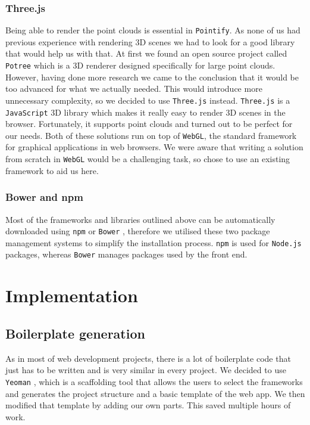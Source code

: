 \documentclass{article}
\begin{document}
\subsubsection{Three.js}
Being able to render the point clouds is essential in \texttt{Pointify}. As none of us had previous experience with
rendering 3D scenes we had to look for a good library that would help us with that. At first we found an open source project called \texttt{Potree} \cite{potree} which is a 3D renderer designed specifically for large point clouds. However, having done more research we came to the conclusion that it would be too advanced for what we actually needed. This would introduce more unnecessary complexity, so we decided to use \texttt{Three.js} instead. \texttt{Three.js} \cite{three} is a \texttt{JavaScript} 3D library which makes it really easy to render 3D scenes in the browser. Fortunately, it supports point clouds and turned out to be perfect for our needs. Both of these solutions run on top of \texttt{WebGL}, the standard framework for graphical applications in web browsers. We were aware that writing a solution from scratch in \texttt{WebGL} would be a challenging task, so chose to use an existing framework to aid us here.
\subsubsection{Bower and npm}
Most of the frameworks and libraries outlined above can be automatically downloaded using \texttt{npm} \cite{npm} or \texttt{Bower} \cite{bower}, therefore we utilised these two package management systems to simplify the installation process. \texttt{npm} \cite{npm} is used for \texttt{Node.js} \cite{node} packages, whereas \texttt{Bower} \cite{bower} manages packages used by the front end.

\newpage
\section{Implementation}
\subsection{Boilerplate generation}
As in most of web development projects, there is a lot of boilerplate code that just has to be written and is very similar in every project. We decided to use \texttt{Yeoman} \cite{yeoman}, which is a scaffolding tool that allows the users to select the frameworks and generates the project structure and a basic template of the web app. We then modified that template by adding our own parts. This saved multiple hours of work.
\end{document}
